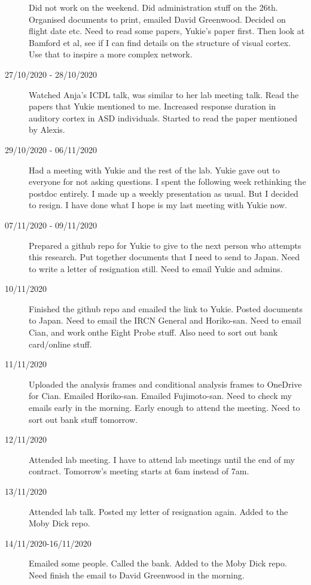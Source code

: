 \documentclass[a4paper,12pt]{article}
\theoremstyle{definition}
\begin{document}
\begin{description}
  Did not work on the weekend. Did administration stuff on the 26th. Organised documents to print, emailed David Greenwood. Decided on flight date etc. Need to read some papers, Yukie's paper first. Then look at Bamford et al, see if I can find details on the structure of visual cortex. Use that to inspire a more complex network.

  \item[27/10/2020 - 28/10/2020] Watched Anja's ICDL talk, was similar to her lab meeting talk. Read the papers that Yukie mentioned to me. Increased response duration in auditory cortex in ASD individuals. Started to read the paper mentioned by Alexis.

  \item[29/10/2020 - 06/11/2020] Had a meeting with Yukie and the rest of the lab. Yukie gave out to everyone for not asking questions. I spent the following week rethinking the postdoc entirely. I made up a weekly presentation as usual. But I decided to resign. I have done what I hope is my last meeting with Yukie now.

  \item[07/11/2020 - 09/11/2020] Prepared a github repo for Yukie to give to the next person who attempts this research. Put together documents that I need to send to Japan. Need to write a letter of resignation still. Need to email Yukie and admins.

  \item[10/11/2020] Finished the github repo and emailed the link to Yukie. Posted documents to Japan. Need to email the IRCN General and Horiko-san. Need to email Cian, and work onthe Eight Probe stuff. Also need to sort out bank card/online stuff.

  \item[11/11/2020] Uploaded the analysis frames and conditional analysis frames to OneDrive for Cian. Emailed Horiko-san. Emailed Fujimoto-san. Need to check my emails early in the morning. Early enough to attend the meeting. Need to sort out bank stuff tomorrow.

  \item[12/11/2020] Attended lab meeting. I have to attend lab meetings until the end of my contract. Tomorrow's meeting starts at 6am instead of 7am.

  \item[13/11/2020] Attended lab talk. Posted my letter of resignation again. Added to the Moby Dick repo.

  \item[14/11/2020-16/11/2020] Emailed some people. Called the bank. Added to the Moby Dick repo. Need finish the email to David Greenwood in the morning.


\end{description}
\end{document}
